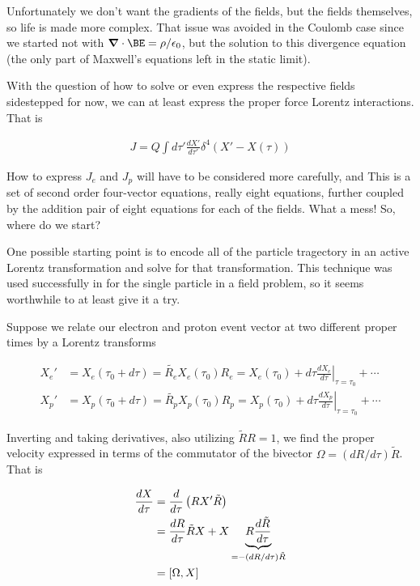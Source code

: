 Unfortunately we don't want the gradients of the fields, but the fields themselves, so life is made more complex.  That issue was avoided in the Coulomb case since we started not with $\spacegrad \cdot \BE = \rho/\epsilon_0$, but the solution to this divergence equation (the only part of Maxwell's equations left in the static limit).





With the question of how to solve or even express the respective fields sidestepped for now, we can at least express the proper force Lorentz interactions.  That is

\begin{align}\label{eqn:nuclearInteraction:hoo5}
J = Q \int d\tau' \frac{dX'}{d\tau'} \delta^4 (X' - X(\tau))
\end{align}


How to express $J_e$ and $J_p$ will have to be considered more carefully, and 
This is a set of second order four-vector equations, really eight equations, further coupled by the addition pair of eight equations for each of the fields.  What a mess!  So, where do we start?

One possible starting point is to encode all of the particle tragectory in an active Lorentz transformation and solve for that transformation.  This technique was used successfully in \cite{doran2003gap} for the single particle in a field problem, so it seems worthwhile to at least give it a try.

Suppose we relate our electron and proton event vector at two different proper times by a Lorentz transforms

\begin{align*}
X_e' &= X_e(\tau_0 + d\tau) = \tilde{R_e} X_e(\tau_0) R_e = X_e(\tau_0) + d\tau {\left. \frac{dX_e}{d\tau} \right\vert}_{\tau = \tau_0} + \cdots \\
X_p' &= X_p(\tau_0 + d\tau) = \tilde{R_p} X_p(\tau_0) R_p = X_p(\tau_0) + d\tau {\left. \frac{dX_p}{d\tau} \right\vert}_{\tau = \tau_0} + \cdots
\end{align*}

%
Inverting and taking derivatives, also utilizing $\tilde{R}{R} = 1$, we find the proper velocity expressed in terms of the commutator of the bivector $\Omega = (dR/d\tau) \tilde{R}$.   That is

\begin{align*}
\frac{dX}{d\tau} 
&= \frac{d}{d\tau} \left( R X' \tilde{R} \right) \\
&= \frac{dR }{d\tau} \tilde{R} X + X \underbrace{R \frac{d\tilde{R}}{d\tau}}_{= - (dR/d\tau) \tilde{R}} \\
&= \left[{ \Omega },{X}\right]
\end{align*}



\EndArticle
